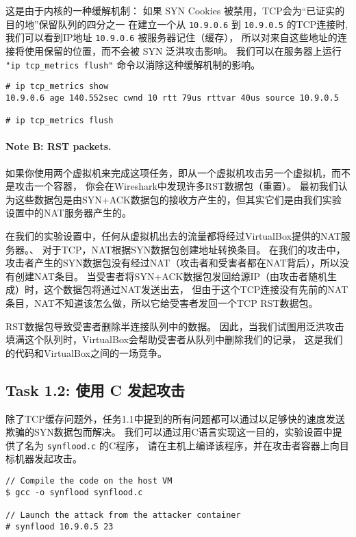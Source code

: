 这是由于内核的一种缓解机制： 
如果 SYN Cookies 被禁用，TCP会为“已证实的目的地”保留队列的四分之一
在建立一个从 \texttt{10.9.0.6} 到 \texttt{10.9.0.5} 的TCP连接时, 
我们可以看到IP地址 \texttt{10.9.0.6} 被服务器记住（缓存），
所以对来自这些地址的连接将使用保留的位置，而不会被 SYN 泛洪攻击影响。
我们可以在服务器上运行 \texttt{"ip tcp\_metrics flush"} 命令以消除这种缓解机制的影响。

\begin{lstlisting}
# ip tcp_metrics show
10.9.0.6 age 140.552sec cwnd 10 rtt 79us rttvar 40us source 10.9.0.5

# ip tcp_metrics flush
\end{lstlisting}


\paragraph{Note B: RST packets.} 
如果你使用两个虚拟机来完成这项任务，即从一个虚拟机攻击另一个虚拟机，而不是攻击一个容器，
你会在Wireshark中发现许多RST数据包（重置）。
最初我们认为这些数据包是由SYN+ACK数据包的接收方产生的，但其实它们是由我们实验设置中的NAT服务器产生的。

在我们的实验设置中，任何从虚拟机出去的流量都将经过VirtualBox提供的NAT服务器。、
对于TCP，NAT根据SYN数据包创建地址转换条目。
在我们的攻击中，攻击者产生的SYN数据包没有经过NAT（攻击者和受害者都在NAT背后），所以没有创建NAT条目。
当受害者将SYN+ACK数据包发回给源IP（由攻击者随机生成）时，这个数据包将通过NAT发送出去，
但由于这个TCP连接没有先前的NAT条目，NAT不知道该怎么做，所以它给受害者发回一个TCP RST数据包。

RST数据包导致受害者删除半连接队列中的数据。
因此，当我们试图用泛洪攻击填满这个队列时，VirtualBox会帮助受害者从队列中删除我们的记录，
这是我们的代码和VirtualBox之间的一场竞争。


\subsection{Task 1.2: 使用 C 发起攻击} 

除了TCP缓存问题外，任务1.1中提到的所有问题都可以通过以足够快的速度发送欺骗的SYN数据包而解决。
我们可以通过用C语言实现这一目的，实验设置中提供了名为 \texttt{synflood.c} 的C程序，
请在主机上编译该程序，并在攻击者容器上向目标机器发起攻击。

\begin{lstlisting}
// Compile the code on the host VM
$ gcc -o synflood synflood.c

// Launch the attack from the attacker container
# synflood 10.9.0.5 23
\end{lstlisting}


